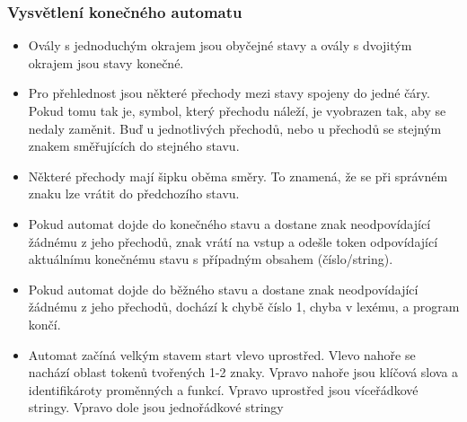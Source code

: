 \documentclass[a4paper, 12pt]{article}
\begin{document}
\subsubsection{Vysvětlení konečného automatu}
\begin{itemize}
    \item Ovály s jednoduchým okrajem jsou obyčejné stavy a ovály s dvojitým okrajem jsou stavy konečné.
    \item Pro přehlednost jsou některé přechody mezi stavy spojeny do jedné čáry. Pokud tomu tak je, symbol, který přechodu náleží, je vyobrazen tak, aby se nedaly zaměnit. Buď u jednotlivých přechodů, nebo u přechodů se stejným znakem směřujících do stejného stavu. 
    \item Některé přechody mají šipku oběma směry. To znamená, že se při správném znaku lze vrátit do předchozího stavu.
    \item Pokud automat dojde do konečného stavu a dostane znak neodpovídající žádnému z jeho přechodů, znak vrátí na vstup a odešle token odpovídající aktuálnímu konečnému stavu s případným obsahem (číslo/string).
    \item Pokud automat dojde do běžného stavu a dostane znak neodpovídající žádnému z jeho přechodů, dochází k chybě číslo 1, chyba v lexému, a program končí.
    \item Automat začíná velkým stavem start vlevo uprostřed. Vlevo nahoře se nachází oblast tokenů tvořených 1-2 znaky. Vpravo nahoře jsou klíčová slova a identifikároty proměnných a funkcí. Vpravo uprostřed jsou víceřádkové stringy. Vpravo dole jsou jednořádkové stringy
\end{itemize}

\newpage
\end{document}
